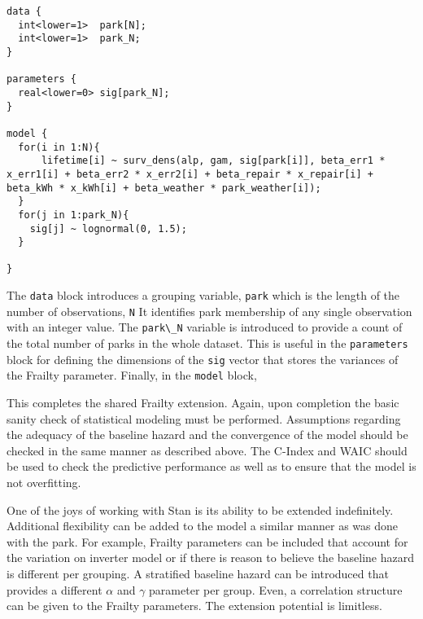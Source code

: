 \begin{lstlisting}
data {
  int<lower=1>  park[N];
  int<lower=1>  park_N;
}

parameters {
  real<lower=0> sig[park_N];
}

model {
  for(i in 1:N){
      lifetime[i] ~ surv_dens(alp, gam, sig[park[i]], beta_err1 * x_err1[i] + beta_err2 * x_err2[i] + beta_repair * x_repair[i] + beta_kWh * x_kWh[i] + beta_weather * park_weather[i]);
  }
  for(j in 1:park_N){
    sig[j] ~ lognormal(0, 1.5);
  }

}
\end{lstlisting}


The \lstinline{data} block introduces a grouping variable, \lstinline{park} which is the length of the number of observations, \lstinline{N} It identifies  park membership of any single observation with an integer value. The \lstinline{park\_N} variable is introduced to provide a count of the total number of parks in the whole dataset. This is useful in the \lstinline{parameters} block for defining the dimensions of the \lstinline{sig} vector that stores the variances of the Frailty parameter. Finally, in the \lstinline{model} block, 

This completes the shared Frailty extension. Again, upon completion the basic sanity check of statistical modeling must be performed. Assumptions regarding the adequacy of the baseline hazard and the convergence of the model should be checked in the same manner as described above. The C-Index and WAIC should be used to check the predictive performance as well as to ensure that the model is not overfitting. 

One of the joys of working with Stan is its ability to be extended indefinitely. Additional flexibility can be added to the model a similar manner as was done with the park. For example, Frailty parameters can be included that account for the variation on inverter model or if there is reason to believe the baseline hazard is different per grouping. A stratified baseline hazard can be introduced that provides a different $\alpha$ and $\gamma$ parameter per group. Even, a correlation structure can be given to the Frailty parameters. The extension potential is limitless. 












